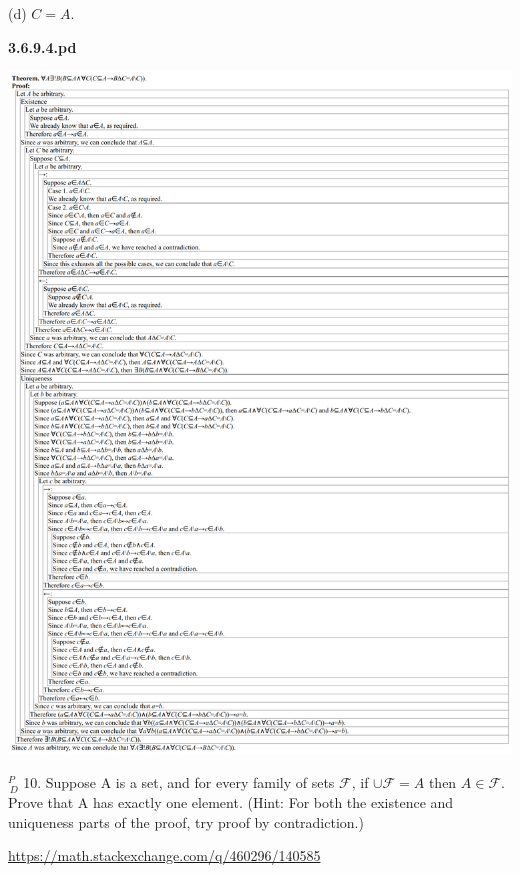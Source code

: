 \documentclass{article}
\begin{document}
\vspace{30pt}

(d) $C = A$.

\textbf{3.6.9.4.pd}
\vspace{10pt}

\includegraphics[width=\textwidth,height=\textheight,keepaspectratio]{3_6_9_4}

\vspace{30pt}

$^{\textit{P}}_{\, \textit{D}}$ 10. Suppose A is a set, and for every family of sets $\mathcal{F}$, if $\cup \mathcal{F} = A$ then $A \in \mathcal{F}$. Prove that A has exactly one element. (Hint: For both the existence
and uniqueness parts of the proof, try proof by contradiction.)

\url{https://math.stackexchange.com/q/460296/140585}

\vspace{30pt}
\end{document}
